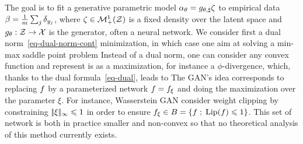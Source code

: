 The goal is to fit a generative parametric model $\alpha_\theta = g_{\theta,\sharp} \zeta$ to empirical data $\beta = \frac{1}{m}\sum_{j} \delta_{y_j}$, where $\zeta \in \mathcal{M}_+^1(\mathcal{Z})$ is a fixed density over the latent space and $g_\theta : \mathcal{Z} \rightarrow \mathcal{X}$ is the generator, often a neural network. We consider first a dual norm~\eqref{eq-dual-norm-cont} minimization, in which case one aim at solving a min-max saddle point problem
Instead of a dual norm, one can consider any convex function and represent is as a maximization,  for instance a $\phi$-divergence, which, thanks to the dual formula~\eqref{eq-dual}, leads to
The GAN's idea corresponds to replacing $f$ by a parameterized network $f=f_\xi$ and doing the maximization over the parameter $\xi$. For instance, Wasserstein GAN consider weight clipping by constraining $|\!| \xi |\!|_\infty \leqslant 1$ in order to ensure $f_\xi \in B = \left\{ f \;;\; \operatorname{Lip}(f) \leqslant 1 \right\}$. This set of network is both in practice smaller and non-convex so that no theoretical analysis of this method currently exists.
